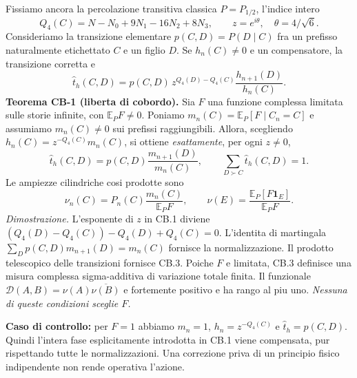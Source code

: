 \documentclass[11pt,a4paper]{article}
\begin{document}
Fissiamo ancora la percolazione transitiva classica $P=P_{1/2}$, l'indice intero
\[
 Q_4(C)=N-N_0+9N_1-16N_2+8N_3,
 \qquad z=e^{i\theta},\quad \theta=4/\sqrt6.
\]
Consideriamo la transizione elementare $p(C,D)=P(D\mid C)$ fra un prefisso naturalmente etichettato $C$ e un figlio $D$. Se $h_n(C)\neq0$ e un compensatore, la transizione corretta e
\begin{equation}
 \widehat t_h(C,D)=p(C,D)\,z^{Q_4(D)-Q_4(C)}
 \frac{h_{n+1}(D)}{h_n(C)}.\tag{CB.1}
\end{equation}
\textbf{Teorema CB-1 (liberta di cobordo).} Sia $F$ una funzione complessa limitata sulle storie infinite, con $\mathbb E_P F\neq0$. Poniamo $m_n(C)=\mathbb E_P[F\mid C_n=C]$ e assumiamo $m_n(C)\neq0$ sui prefissi raggiungibili. Allora, scegliendo $h_n(C)=z^{-Q_4(C)}m_n(C)$, si ottiene \emph{esattamente}, per ogni $z\neq0$,
\begin{equation}
 \boxed{\widehat t_h(C,D)=p(C,D)\frac{m_{n+1}(D)}{m_n(C)},
 \qquad \sum_{D\succ C}\widehat t_h(C,D)=1.}\tag{CB.2}
\end{equation}
Le ampiezze cilindriche cosi prodotte sono
\begin{equation}
 \boxed{\nu_n(C)=P_n(C)\frac{m_n(C)}{\mathbb E_P F},\qquad
 \nu(E)=\frac{\mathbb E_P[F\mathbf1_E]}{\mathbb E_P F}.}\tag{CB.3}
\end{equation}
\emph{Dimostrazione.} L'esponente di $z$ in CB.1 diviene $(Q_4(D)-Q_4(C))-Q_4(D)+Q_4(C)=0$. L'identita di martingala $\sum_D p(C,D)m_{n+1}(D)=m_n(C)$ fornisce la normalizzazione. Il prodotto telescopico delle transizioni fornisce CB.3. Poiche $F$ e limitata, CB.3 definisce una misura complessa sigma-additiva di variazione totale finita. Il funzionale $\mathcal D(A,B)=\nu(A)\overline{\nu(B)}$ e fortemente positivo e ha rango al piu uno. \emph{Nessuna di queste condizioni sceglie $F$.}

\textbf{Caso di controllo:} per $F=1$ abbiamo $m_n=1$, $h_n=z^{-Q_4(C)}$ e $\widehat t_h=p(C,D)$. Quindi l'intera fase esplicitamente introdotta in CB.1 viene compensata, pur rispettando tutte le normalizzazioni. Una correzione priva di un principio fisico indipendente non rende operativa l'azione.

\clearpage
\end{document}
